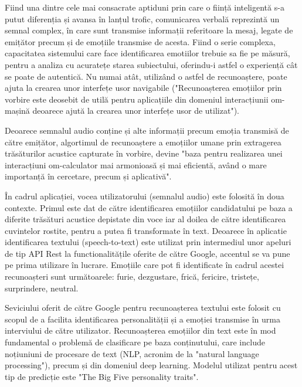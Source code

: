 \documentclass[a4paper, 12pt]{report}
\begin{document}
	Fiind una dintre cele mai consacrate aptiduni prin care o ființă inteligentă s-a putut diferenția și avansa în lanțul trofic, comunicarea verbală reprezintă un semnal complex, în care sunt transmise informații referitoare la mesaj, legate de emițător precum și de emoțiile transmise de acesta. Fiind o serie complexa, capacitatea sistemului care face identificarea emotiilor trebuie sa fie pe măsură, pentru a analiza cu acuratețe starea subiectului, oferindu-i astfel o experiență cât se poate de autentică. Nu numai atât, utilizând o astfel de recunoaștere, poate ajuta la crearea unor interfețe usor navigabile ("Recunoașterea emoțiilor prin vorbire este deosebit de utilă pentru aplicațiile din domeniul interacțiunii om-mașină deoarece ajută la crearea unor interfețe usor de utilizat"\cite{emotion_recognition_survery}).
	
	Deoarece semnalul audio conține și alte informații precum emoția transmisă de către emițător, algortimul de recunoaștere a emoțiilor umane prin extragerea trăsăturilor acustice capturate în vorbire, devine "baza pentru realizarea unei interacțiuni om-calculator mai armonioasă și mai eficientă, având o mare importanță în cercetare, precum și aplicativă"\cite{audio_emotion_recognition0}.
	
	În cadrul aplicației, vocea utilizatorului (semnalul audio) este folosită în doua contexte. Primul este dat de către identificarea emoțiilor candidatului pe baza a diferite trăsături acustice depistate din voce iar al doilea de către identificarea cuvintelor rostite, pentru a putea fi transformate în text. Deoarece în aplicatie identificarea textului (speech-to-text) este utilizat prin intermediul unor apeluri de tip API Rest la functionalitățile oferite de către Google, accentul se va pune pe prima utilizare în lucrare. Emoțiile care pot fi identificate în cadrul acestei recunoașteri sunt următoarele: furie, dezgustare, frică, fericire, tristețe, surprindere, neutral.
	
	Seviciului oferit de către Google pentru recunoașterea textului \cite{google_speech_to_text} este folosit cu scopul de a facilita identificarea personalității și a emoției transmise în urma interviului de către utilizator. Recunoașterea emoțiilor din text este în mod fundamental o problemă de clasificare pe baza conținutului, care include noțiuniuni de procesare de text (NLP, acronim de la "natural language processing"), precum și din domeniul deep learning. Modelul utilizat pentru acest tip de predicție este "The Big Five personality traits"\cite{big_five_personality_wiki}. 
	
\end{document}
